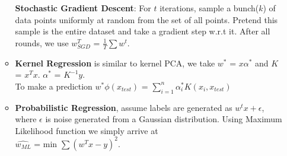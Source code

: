 \documentclass[a4paper]{article}
\begin{document}
\begin{enumerate}
\begin{itemize}
        \textbf{Stochastic Gradient Descent}: For $t$ iterations, sample a bunch($k$) of data points uniformly at random from the set of all points. Pretend this sample is the entire dataset and take a gradient step w.r.t it. After all rounds, we use $w^T_{SGD}$ = $\frac{1}{T}\sum w^t$.
        \item \textbf{Kernel Regression} is similar to kernel PCA, we take $w^*$ = $x\alpha^*$ and $K$ = $x^Tx$. $\alpha^*$ = $K^{-1}y$.\\
        To make a prediction $w^*\phi(x_{test})$ = $\sum_{i=1}^n\alpha_i^*K(x_i,x_{test})$
        \item \textbf{Probabilistic Regression}, assume labels are generated as $w^tx + \epsilon$, where $\epsilon$ is noise generated from a Gaussian distribution. Using Maximum Likelihood function we simply arrive at\\
        $\hat{w_{ML}}$ = min $\sum(w^Tx - y)^2$.
    \end{itemize}
\end{enumerate}
\end{document}
